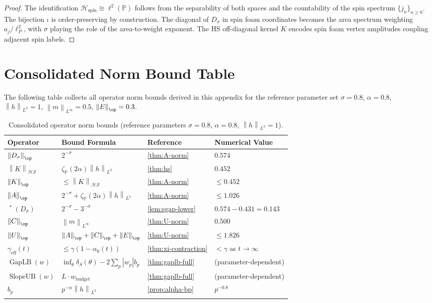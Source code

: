 \documentclass[12pt,letterpaper]{article}
\theoremstyle{definition}
\theoremstyle{remark}
\DeclareMathOperator{\GapLB}{GapLB}
\DeclareMathOperator{\SlopeUB}{SlopeUB}
\DeclareMathOperator{\sgap}{\delta_S}
\newcommand{\PP}{\mathbb{P}}
\newcommand{\HS}{\mathcal{HS}}
\newcommand{\norm}[1]{\left\|#1\right\|}
\newcommand{\abs}[1]{\left|#1\right|}
\newcommand{\lp}{\ell^2(\PP)}
\begin{document}
\begin{proof}
The identification $\mathcal{H}_{\mathrm{spin}} \cong \lp$ follows from
the separability of both spaces and the countability of the spin spectrum
$\{j_n\}_{n \geq 0}$. The bijection $\iota$ is order-preserving by
construction. The diagonal of $D_\sigma$ in spin foam coordinates becomes
the area spectrum weighting $a_j / \ell_P^2$, with $\sigma$ playing the role
of the area-to-weight exponent. The HS off-diagonal kernel $K$ encodes
spin foam vertex amplitudes coupling adjacent spin labels.
\end{proof}

\section{Consolidated Norm Bound Table}
\label{app:bounds-table}

The following table collects all operator norm bounds derived in this appendix
for the reference parameter set
$\sigma = 0.8$, $\alpha = 0.8$, $\norm{h}_{L^2} = 1$,
$\norm{m}_{L^\infty} = 0.5$, $\norm{E}_{\op} = 0.3$.

\begin{longtable}{llll}
\toprule
\textbf{Operator} & \textbf{Bound Formula} & \textbf{Reference}
  & \textbf{Numerical Value} \\
\midrule
$\norm{D_\sigma}_{\op}$ & $2^{-\sigma}$ & \cref{thm:A-norm}
  & $0.574$ \\[2pt]
$\norm{K}_{\HS}$ & $\zeta_\PP(2\alpha)\norm{h}_{L^2}$ & \cref{thm:hs}
  & $0.452$ \\[2pt]
$\norm{K}_{\op}$ & $\leq \norm{K}_{\HS}$ & \cref{thm:A-norm}
  & $\leq 0.452$ \\[2pt]
$\norm{A}_{\op}$ & $2^{-\sigma} + \zeta_\PP(2\alpha)\norm{h}_{L^2}$
  & \cref{thm:A-norm} & $\leq 1.026$ \\[2pt]
$\sgap^*(D_\sigma)$ & $2^{-\sigma} - 3^{-\sigma}$
  & \cref{lem:sgap-lower} & $0.574 - 0.431 = 0.143$ \\[2pt]
$\norm{C}_{\op}$ & $\norm{m}_{L^\infty}$ & \cref{thm:U-norm} & $0.500$ \\[2pt]
$\norm{U}_{\op}$ & $\norm{A}_{\op}+\norm{C}_{\op}+\norm{E}_{\op}$
  & \cref{thm:U-norm} & $\leq 1.826$ \\[2pt]
$\gamma_{\mathrm{eff}}(t)$ & $\leq \gamma(1-\alpha_0(t))$
  & \cref{thm:xi-contraction} & $<\gamma$ as $t\to\infty$ \\[2pt]
$\GapLB(w)$ & $\inf_\theta\delta_S(\theta) - 2\sum_p\abs{w_p}b_p$
  & \cref{thm:gaplb-full} & (parameter-dependent) \\[2pt]
$\SlopeUB(w)$ & $L\cdot w_{\mathrm{budget}}$
  & \cref{thm:gaplb-full} & (parameter-dependent) \\[2pt]
$b_p$ & $p^{-\alpha}\norm{h}_{L^2}$
  & \cref{prop:alpha-bp} & $p^{-0.8}$ \\
\bottomrule
\caption{Consolidated operator norm bounds (reference parameters $\sigma=0.8$,
$\alpha=0.8$, $\norm{h}_{L^2}=1$).}
\end{longtable}

\nocite{*}
  

\end{document}
